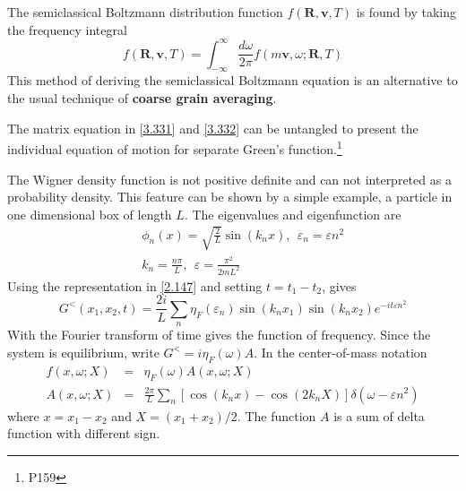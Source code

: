 The semiclassical Boltzmann distribution function $f(\mathbf{R},\mathbf{v},T)$ is found by taking the frequency integral
\begin{equation}
    f(\mathbf{R},\mathbf{v},T) = \int_{-\infty}^\infty \frac{d \omega}{2\pi} f(m\mathbf{v},\omega;\mathbf{R},T)     \label{3.340}
\end{equation}
This method of deriving the semiclassical Boltzmann equation is an alternative to the usual technique of \textbf{coarse grain averaging}.

The matrix equation in \eqref{3.331} and \eqref{3.332} can be untangled to present the individual equation of motion for separate Green's function.\footnote{P159}

The Wigner density function is not positive definite and can not interpreted as a probability density.
This feature can be shown by a simple example, a particle in one dimensional box of length $L$.
The eigenvalues and eigenfunction are
\begin{eqnarray}
    &&\phi_n(x) = \sqrt{ \frac{2}{L} } \sin(k_n x), ~ ~ \varepsilon_n = \varepsilon n^2 \label{3.343} \\
    && k_n = \frac{n\pi}{L} , ~ ~ \varepsilon = \frac{\pi^2}{2mL^2}  \label{3.344}
\end{eqnarray}
Using the representation in \eqref{2.147} and setting $t = t_1 -t_2$, gives
\begin{equation}
    G^<(x_1,x_2,t) = \frac{2i}{L} \sum_n \eta_F(\varepsilon_n) \sin(k_n x_1) \sin(k_nx_2) e^{-it \varepsilon n^2}   \label{3.345}
\end{equation}
With the Fourier transform of time gives the function of frequency.
Since the system is equilibrium, write $G^< = i\eta_F(\omega)A$.
In the center-of-mass notation
\begin{eqnarray}
    f(x,\omega;X) &=& \eta_F(\omega) A(x,\omega;X)  \label{3.346} \\
    A(x,\omega;X) &=& \frac{2\pi}{L} \sum_n \left[ \cos(k_n x) - \cos(2k_n X) \right] \delta(\omega-\varepsilon n^2)    \label{3.347}
\end{eqnarray}
where $x= x_1-x_2$ and $X= (x_1+ x_2)/2$.
The function $A$ is a sum of delta function with different sign.
